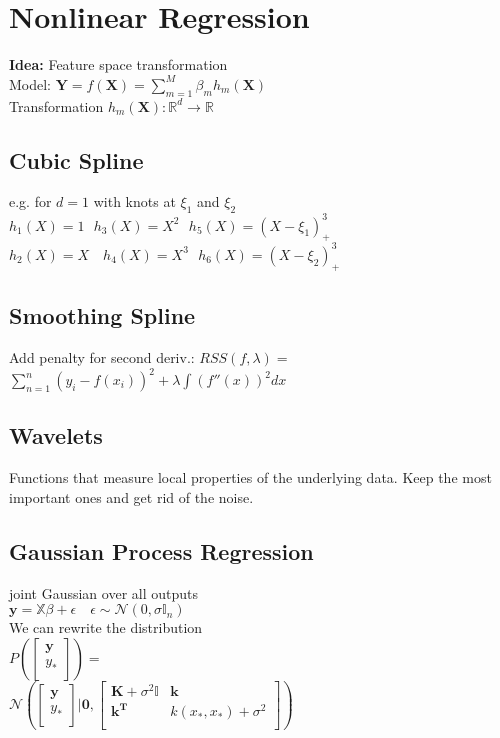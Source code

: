 \section*{Nonlinear Regression}
\textbf{Idea:} Feature space transformation\\
Model: $\mathbf{Y}=f(\mathbf{X})=\sum_{m=1}^M\beta_m h_m(\mathbf{X})$\\
Transformation $h_m(\mathbf{X}):\mathbb{R}^d \rightarrow \mathbb{R}$


 \subsection*{Cubic Spline}
 e.g. for $d=1$ with knots at $\xi_1$ and $\xi_2$\\
 $h_1(X){=}1\ \ \ h_3(X){=}X^2\ \ \ h_5(X){=}(X{-}\xi_1)^3_+$ \ \ \
 $h_2(X){=}X \quad h_4(X){=}X^3\ \ \ h_6(X){=}(X{-}\xi_2)^3_+$

 \subsection*{Smoothing Spline}
 Add penalty for second deriv.:  
 $RSS(f, \lambda) {=}$
 $ \sum_{n=1}^n (y_i-f(x_i))^2 + \lambda\int (f''(x))^2 dx$
\subsection*{Wavelets}
 Functions that measure local properties of the underlying data. Keep the most important ones and get rid of the noise.

\subsection*{Gaussian Process Regression}
joint Gaussian over all outputs\\
$\mathbf{y}=\mathbb{X}\beta+\epsilon \quad \epsilon\sim \mathcal{N}(0,\sigma\mathbb{I}_n)$\\
We can rewrite the distribution\\
$P(\begin{bmatrix}
\mathbf{y}\\
y_*\\
\end{bmatrix}){=}$\\$\mathcal{N}(\begin{bmatrix}
\mathbf{y}\\
y_*\\
\end{bmatrix}|\mathbf{0},\begin{bmatrix}
\mathbf{K}+\sigma^2\mathbb{I} & \mathbf{k} \\
\mathbf{k^T} & k(x_*,x_*) + \sigma^2\\
\end{bmatrix})$\\

